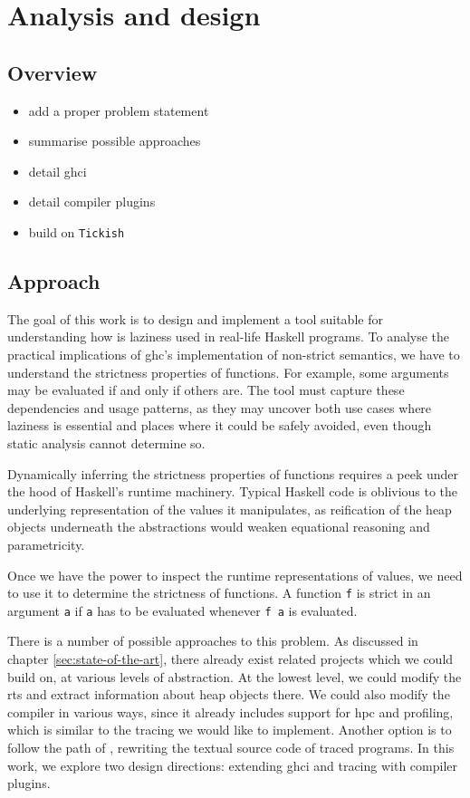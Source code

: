 \documentclass[thesis=B,english]{FITthesis}[2019/12/23]
\newcommand{\hsIdent}[1]{\texttt{#1}}
\newcommand{\hsCode}[1]{\texttt{#1}}
\begin{document}
\chapter{Analysis and design} \label{sec:analysis-design}

\section{Overview} \label{sec:analysis-overview}
\begin{itemize}
	\item add a proper problem statement
	\item summarise possible approaches
	\item detail \acrshort{ghci}
	\item detail compiler plugins
	\item build on \texttt{Tickish}
\end{itemize}

\section{Approach} \label{sec:approach}

The goal of this work is to design and implement a tool suitable for
understanding how is laziness used in real-life Haskell programs. To analyse
the practical implications of \acrshort{ghc}'s implementation of non-strict
semantics, we have to understand the strictness properties of functions. For
example, some arguments may be evaluated if and only if others are. The tool
must capture these dependencies and usage patterns, as they may uncover both
use cases where laziness is essential and places where it could be safely
avoided, even though static analysis cannot determine so.

Dynamically inferring the strictness properties of functions requires a peek
under the hood of Haskell's runtime machinery. Typical Haskell code is
oblivious to the underlying representation of the values it manipulates, as
reification of the heap objects underneath the abstractions would weaken
equational reasoning and parametricity.

Once we have the power to inspect the runtime representations of values, we
need to use it to determine the strictness of functions. A function \hsIdent{f}
is strict in an argument \hsIdent{a} if \hsIdent{a} has to be evaluated
whenever \hsCode{f a} is evaluated.

There is a number of possible approaches to this problem. As discussed in
chapter \ref{sec:state-of-the-art}, there already exist related projects which
we could build on, at various levels of abstraction. At the lowest level, we
could modify the \acrshort{rts} and extract information about heap objects
there. We could also modify the compiler in various ways, since it already
includes support for \acrshort{hpc} and profiling, which is similar to the
tracing we would like to implement. Another option is to follow the path of
, rewriting the textual source code of traced programs. In
this work, we explore two design directions: extending \acrshort{ghci} and
tracing with compiler plugins.
\end{document}
